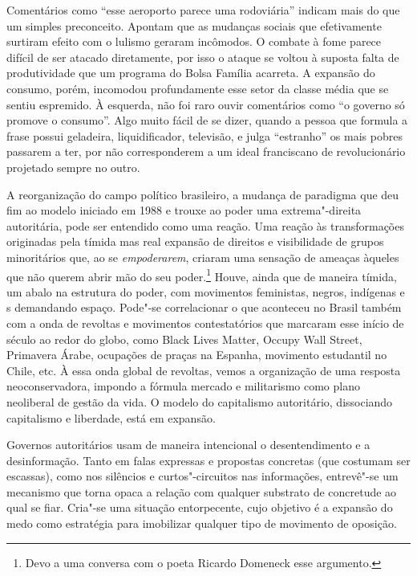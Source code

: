 Comentários como ``esse aeroporto parece uma rodoviária'' indicam mais
do que um simples preconceito. Apontam que as mudanças sociais que
efetivamente surtiram efeito com o lulismo geraram incômodos. O combate
à fome parece difícil de ser atacado diretamente, por isso o ataque se
voltou à suposta falta de produtividade que um programa do Bolsa Família
acarreta. A expansão do consumo, porém, incomodou profundamente esse
setor da classe média que se sentiu espremido. À esquerda, não foi
raro ouvir comentários como ``o governo só promove o consumo''. Algo
muito fácil de se dizer, quando a pessoa que formula a frase possui
geladeira, liquidificador, televisão, e julga ``estranho'' os mais
pobres passarem a ter, por não corresponderem a um ideal franciscano de
revolucionário projetado sempre no outro.

A reorganização do campo político brasileiro, a mudança de paradigma que
deu fim ao modelo iniciado em 1988 e trouxe ao poder uma extrema"-direita
autoritária, pode ser entendido como uma reação. Uma reação às
transformações originadas pela tímida mas real expansão de direitos e
visibilidade de grupos minoritários que, ao se \emph{empoderarem},
criaram uma sensação de ameaças àqueles que não querem abrir mão do seu
poder.\footnote{Devo a uma conversa com o poeta Ricardo
  Domeneck esse argumento.} Houve, ainda que de maneira tímida, um
abalo na estrutura do poder, com movimentos feministas, negros,
indígenas e s demandando espaço. Pode"-se correlacionar o que aconteceu no Brasil
também com a onda de revoltas e movimentos contestatórios que marcaram
esse início de século  ao redor do globo, como Black Lives Matter,
Occupy Wall Street, Primavera Árabe, ocupações de praças na Espanha,
movimento estudantil no Chile, etc. À essa onda global de revoltas,
vemos a organização de uma resposta neoconservadora, impondo a fórmula
mercado e militarismo como plano neoliberal de gestão da vida. O modelo
do capitalismo autoritário, dissociando capitalismo e liberdade, está em
expansão.

Governos autoritários usam de
maneira intencional o desentendimento e a desinformação. Tanto em falas
expressas e propostas concretas (que costumam ser escassas), como nos
silêncios e curtos"-circuitos nas informações, entrevê"-se um mecanismo
que torna opaca a relação com qualquer substrato de concretude ao qual
se fiar. Cria"-se uma situação entorpecente, cujo objetivo é a expansão
do medo como estratégia para imobilizar qualquer tipo de movimento de
oposição.

